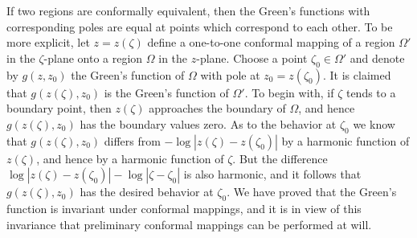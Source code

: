 If two regions are conformally equivalent, then the Green's functions with corresponding poles are equal at points which correspond to each other. To be more explicit, let $z = z(\zeta)$ define a one-to-one conformal mapping of a region $\Omega'$ in the $\zeta$-plane onto a region $\Omega$ in the $z$-plane. Choose a point $\zeta_0 \in \Omega'$ and denote by $g(z, z_0)$ the Green's function of $\Omega$ with pole at $z_0 = z(\zeta_0)$. It is claimed that $g(z(\zeta), z_0)$ is the Green's function of $\Omega'$. To begin with, if $\zeta$ tends to a boundary point, then $z(\zeta)$ approaches the boundary of $\Omega$, and hence $g(z(\zeta), z_0)$ has the boundary
values zero. As to the behavior at $\zeta_0$ we know that $g(z(\zeta), z_0)$ differs from $-\log |z(\zeta) - z(\zeta_0)|$ by a harmonic function of $z(\zeta)$, and hence by a harmonic function of $\zeta$. But the difference $\log |z(\zeta) - z(\zeta_0)| - \log |\zeta - \zeta_0|$ is also harmonic, and it follows that $g(z(\zeta), z_0)$ has the desired behavior at $\zeta_0$. We have proved that the Green's function is invariant under conformal mappings, and it is in view of this invariance that preliminary conformal mappings can be performed at will.

